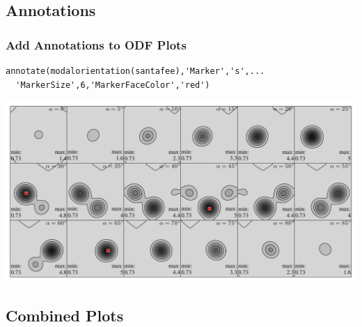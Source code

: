 \subsection*{Annotations}

\begin{frame}[fragile]
  \frametitle{Add Annotations to ODF Plots}


\begin{lstlisting}
annotate(modalorientation(santafee),'Marker','s',...
  'MarkerSize',6,'MarkerFaceColor','red')
\end{lstlisting}

\includegraphics[width=\textwidth]{pic/odfanotate}

\end{frame}

\subsection*{Combined Plots}

